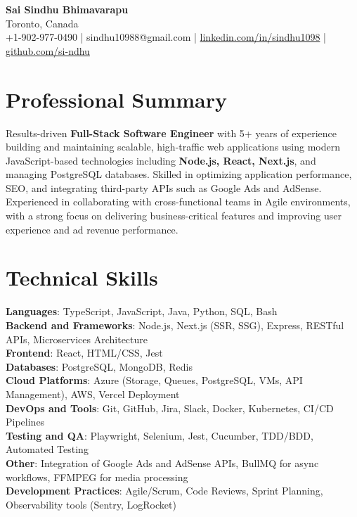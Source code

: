 \documentclass[letterpaper,11pt]{article}
\begin{document}
\begin{center}
  {\Large \textbf{Sai Sindhu Bhimavarapu}} \\
  Toronto, Canada \\
  +1-902-977-0490 \enspace | \enspace sindhu10988@gmail.com \enspace | \enspace \href{https://www.linkedin.com/in/sindhu1098/}{linkedin.com/in/sindhu1098} \enspace | \enspace \href{https://github.com/si-ndhu}{github.com/si-ndhu}
\end{center}

\section{Professional Summary}
  \begin{itemize}[leftmargin=0.15in, label={}]
    \small{\item{
     Results-driven \textbf{Full-Stack Software Engineer} with 5+ years of experience building and maintaining scalable, high-traffic web applications using modern JavaScript-based technologies including \textbf{Node.js, React, Next.js}, and managing PostgreSQL databases. Skilled in optimizing application performance, SEO, and integrating third-party APIs such as Google Ads and AdSense. Experienced in collaborating with cross-functional teams in Agile environments, with a strong focus on delivering business-critical features and improving user experience and ad revenue performance.
    }}
  \end{itemize}
\vspace{-16pt}

\section{Technical Skills}
 \begin{itemize}[leftmargin=0.15in, label={}]
    \small{\item{
     \textbf{Languages}: TypeScript, JavaScript, Java, Python, SQL, Bash \\
     \textbf{Backend and Frameworks}: Node.js, Next.js (SSR, SSG), Express, RESTful APIs, Microservices Architecture \\
     \textbf{Frontend}: React, HTML/CSS, Jest \\
     \textbf{Databases}: PostgreSQL, MongoDB, Redis \\
     \textbf{Cloud Platforms}: Azure (Storage, Queues, PostgreSQL, VMs, API Management), AWS, Vercel Deployment \\
     \textbf{DevOps and Tools}: Git, GitHub, Jira, Slack, Docker, Kubernetes, CI/CD Pipelines \\
     \textbf{Testing and QA}: Playwright, Selenium, Jest, Cucumber, TDD/BDD, Automated Testing \\
     \textbf{Other}: Integration of Google Ads and AdSense APIs, BullMQ for async workflows, FFMPEG for media processing \\
     \textbf{Development Practices}: Agile/Scrum, Code Reviews, Sprint Planning, Observability tools (Sentry, LogRocket)
    }}
 \end{itemize}
\vspace{-16pt}
\end{document}
